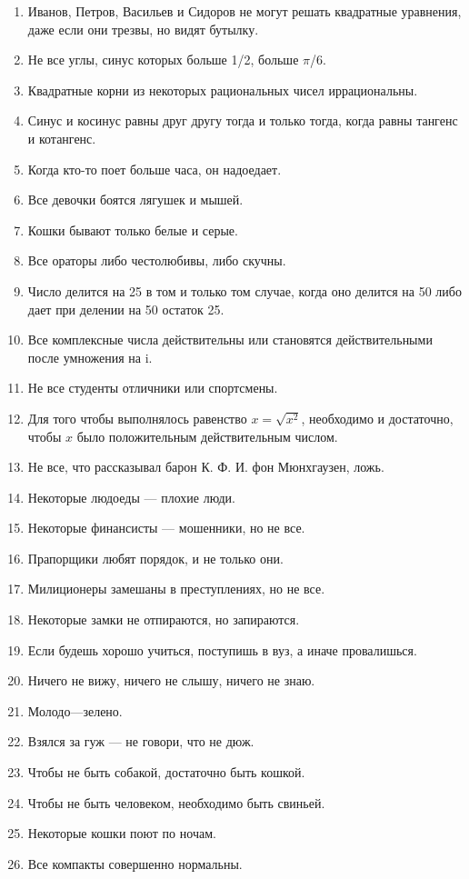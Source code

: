 \documentclass[14pt]{extreport}
\begin{document}
\begin{enumerate}
\item Иванов, Петров, Васильев и Сидоров не могут решать квадратные уравнения, даже если они трезвы, но видят бутылку.
\item Не все углы, синус которых больше 1/2, больше $\pi$/6.
\item Квадратные корни из некоторых рациональных чисел иррациональны.
\item Синус и косинус равны друг другу тогда и только тогда, когда равны тангенс и котангенс.
\item  Когда кто-то поет больше часа, он надоедает.
\item Все девочки боятся лягушек и мышей.
\item Кошки бывают только белые и серые.
\item  Все ораторы либо честолюбивы, либо скучны.
\item Число делится на 25 в том и только том случае, когда оно делится на 50 либо дает при делении на 50 остаток 25.
\item Все комплексные числа действительны или становятся действительными после умножения на i.
\item Не все студенты отличники или спортсмены.
\item Для того чтобы выполнялось равенство $x = \sqrt{x^2}$, необходимо и достаточно, чтобы $x$ было положительным действительным числом.
\item Не все, что рассказывал барон К. Ф. И. фон Мюнхгаузен, ложь.
\item Некоторые людоеды — плохие люди.
\item Некоторые финансисты — мошенники, но не все.
\item Прапорщики любят порядок, и не только они.
\item Милиционеры замешаны в преступлениях, но не все.
\item Некоторые замки не отпираются, но запираются.
\item Если будешь хорошо учиться, поступишь в вуз, а иначе
провалишься.
\item Ничего не вижу, ничего не слышу, ничего не знаю.
\item Молодо—зелено.
\item Взялся за гуж --- не говори, что не дюж.
\item Чтобы не быть собакой, достаточно быть кошкой.
\item Чтобы не быть человеком, необходимо быть свиньей.
\item Некоторые кошки поют по ночам.
\item Все компакты совершенно нормальны.

\end{enumerate}
\end{document}
